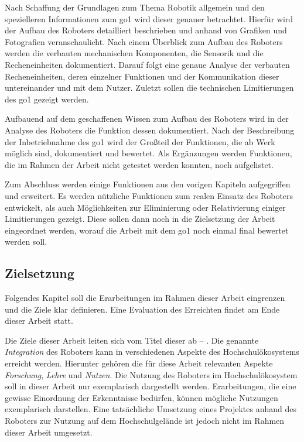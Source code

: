 Nach Schaffung der Grundlagen zum Thema Robotik allgemein und den spezielleren Informationen zum \gls{go1} wird dieser
genauer betrachtet.
Hierfür wird der Aufbau des Roboters detailliert beschrieben und anhand von Grafiken und Fotografien veranschaulicht.
Nach einem Überblick zum Aufbau des Roboters werden die verbauten mechanischen Komponenten, die Sensorik und die Recheneinheiten
dokumentiert.
Darauf folgt eine genaue Analyse der verbauten Recheneinheiten, deren einzelner Funktionen und der Kommunikation dieser
untereinander und mit dem Nutzer.
Zuletzt sollen die technischen Limitierungen des \gls{go1} gezeigt werden.

Aufbauend auf dem geschaffenen Wissen zum Aufbau des Roboters wird in der Analyse des Roboters die Funktion dessen
dokumentiert.
Nach der Beschreibung der Inbetriebnahme des \gls{go1} wird der Großteil der Funktionen, die ab Werk möglich sind,
dokumentiert und bewertet.
Als Ergänzungen werden Funktionen, die im Rahmen der Arbeit nicht getestet werden konnten, noch aufgelistet.

Zum Abschluss werden einige Funktionen aus den vorigen Kapiteln aufgegriffen und erweitert.
Es werden nützliche Funktionen zum realen Einsatz des Roboters entwickelt, als auch Möglichkeiten zur Eliminierung oder
Relativierung einiger Limitierungen gezeigt.
Diese sollen dann noch in die Zielsetzung der Arbeit eingeordnet werden, worauf die Arbeit mit dem \gls{go1} noch einmal
final bewertet werden soll.

\subsection{Zielsetzung}
\label{subsec:zielsetzung}

Folgendes Kapitel soll die Erarbeitungen im Rahmen dieser Arbeit eingrenzen und die Ziele klar definieren.
Eine Evaluation des Erreichten findet am Ende dieser Arbeit statt.


Die Ziele dieser Arbeit leiten sich vom Titel dieser ab -- \emph{\mytitle}.
Die genannte \emph{Integration} des Roboters kann in verschiedenen Aspekte des Hochschulökosystems erreicht werden.
Hierunter gehören die für diese Arbeit relevanten Aspekte \emph{Forschung}, \emph{Lehre} und \emph{Nutzen}.
Die Nutzung des Roboters im Hochschulökosystem soll in dieser Arbeit nur exemplarisch dargestellt werden.
Erarbeitungen, die eine gewisse Einordnung der Erkenntnisse bedürfen, können mögliche Nutzungen exemplarisch darstellen.
Eine tatsächliche Umsetzung eines Projektes anhand des Roboters zur Nutzung auf dem Hochschulgelände ist jedoch nicht
im Rahmen dieser Arbeit umgesetzt.

